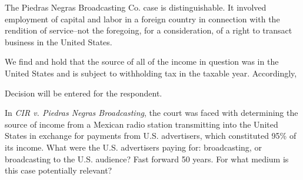 \begin{select}
The Piedras Negras Broadcasting Co. case is distinguishable. It involved employment of capital and labor in a foreign country in connection with the rendition of service--not the foregoing, for a consideration, of a right to transact business in the United States.

We find and hold that the source of all of the income in question was in the United States and is subject to withholding tax in the taxable year. Accordingly,

Decision will be entered for the respondent.
\end{select}

In \emph{CIR v. Piedras Negras Broadcasting}, the court was faced with determining the source of income from a Mexican radio station transmitting into the United States in exchange for payments from U.S. advertisers, which constituted 95\% of its income.  What were the U.S. advertisers paying for: broadcasting, or broadcasting to the U.S. audience?  Fast forward 50 years.  For what medium is this case potentially relevant?      
   
